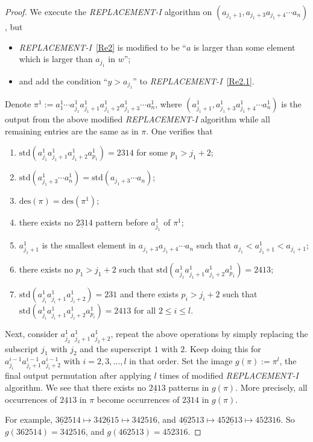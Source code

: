 \documentclass[11pt,reqno]{amsart}
\numberwithin{equation}{section}
\theoremstyle{plain}
\theoremstyle{definition}
\def\des{\mathrm{des}}
\def\std{\mathrm{std}}
\begin{document}
\begin{proof}
  We execute the \textit{REPLACEMENT-I} algorithm on $(a_{j_1+1},a_{j_1+3}a_{j_1+4}\cdots a_n)$, but
  \begin{itemize}
      \item \textit{REPLACEMENT-I}~\ref{Re2} is modified to be ``$a$ is larger than some element which is larger than $a_{j_1}$ in $w$'';
      \item  and add the condition ``$y>a_{j_1}$'' to \textit{REPLACEMENT-I}~\ref{Re2.1}. 
  \end{itemize}
  Denote $\pi^1:=a_1^1\cdots a_{j_1}^1a_{j_1+1}^1a_{j_1+2}^1a_{j_1+3}^1 \cdots a_n^1$, where $(a_{j_1+1}^1,a_{j_1+3}^1a_{j_1+4}^1\cdots a_n^1)$ is the output from the above modified \textit{REPLACEMENT-I} algorithm while all remaining entries are the same as in $\pi$. One verifies that 
  \begin{enumerate}[label=(\roman*)]
      \item $\std(a_{j_1}^1a_{j_1+1}^1a_{j_1+2}^1a_{p_1}^1)=2314$ for some $p_1>j_1+2$;
      \item $\std(a_{j_1+3}^1 \cdots a_n^1)=\std(a_{j_1+3} \cdots a_n)$;
      \item $\des(\pi)=\des(\pi^1)$;
      \item there exists no $\underline{231}4$ pattern before $a_{j_1}^1$ of $\pi^1$;
      \item $a_{j_1+1}^1$ is the smallest element in $a_{j_1+3}a_{j_1+4}\cdots a_n$ such that $a_{j_1}<a_{j_1+1}^1<a_{j_1+1}$;
      \item there exists no $p_1>j_1+2$ such that $\std(a_{j_1}^1a_{j_1+1}^1a_{j_1+2}^1a_{p_1}^1)=2413$;
      \item $\std(a_{j_i}^1a_{j_i+1}^1a_{j_i+2}^1)=231$ and there exists $p_i>j_i+2$ such that $\std(a_{j_i}^1a_{j_i+1}^1a_{j_i+2}^1a_{p_i}^1)=2413$ for all $2\le i\le l$.
  \end{enumerate}
  Next, consider $a_{j_2}^1 a_{j_2+1}^1 a_{j_2+2}^1$, repeat the above operations by simply replacing the subscript $j_1$ with $j_2$ and the 
  superscript $1$ with $2$. Keep doing this for $a_{j_i}^{i-1} a_{j_i+1}^{i-1} a_{j_i+2}^{i-1}$ with $i=2,3,\ldots, l$ in that order. Set the image $g(\pi):=\pi^l$, the final output permutation after applying $l$ times of modified \textit{REPLACEMENT-I} algorithm. We see that there exists no $\underline{241}3$ patterns in $g(\pi)$. More precisely, all occurrences of $\underline{241}3$ in $\pi$ become occurrences of $\underline{231}4$ in $g(\pi)$.

  For example, $\underline{362}514 \mapsto 34\underline{261}5 \mapsto 342516$, and
  $\underline{462}513 \mapsto 45\underline{261}3 \mapsto 452316$. So $g(362514)=342516$, and $g(462513)=452316$.


\end{proof}
\end{document}
